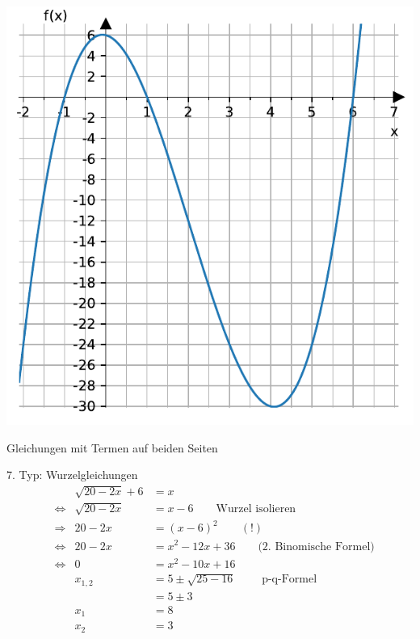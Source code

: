 \documentclass[
  ignorenonframetext,
  aspectratio=169,
]{beamer}
\begin{document}
\begin{frame}
\includegraphics{3_Gleichungen_files/figure-beamer/cell-7-output-1.pdf}
\end{frame}

\begin{frame}
\begin{block}{Gleichungen mit Termen auf beiden Seiten}
\label{gleichungen-mit-termen-auf-beiden-seiten}
\begin{block}{7. Typ: Wurzelgleichungen}
\label{typ-wurzelgleichungen}
\[
\begin{aligned}
&&\sqrt{20-2x}+6 &= x\\ 
&\Leftrightarrow &\sqrt{20-2x} &= x-6 \qquad \text{Wurzel isolieren}\\ 
&\Rightarrow &20-2x &= (x-6)^2 \qquad (!)\\ 
&\Leftrightarrow &20-2x &= x^2-12x + 36 \qquad \text{(2. Binomische Formel)}\\ 
&\Leftrightarrow &0 &= x^2-10x + 16\\
&& x_{1, 2} &= 5\pm\sqrt{25-16} \qquad \text{ p-q-Formel}\\
&&&=5 \pm 3\\
&&x_1 &= 8\\
&&x_2 &= 3
\end{aligned}
\]
\end{block}
\end{block}
\end{frame}
\end{document}
